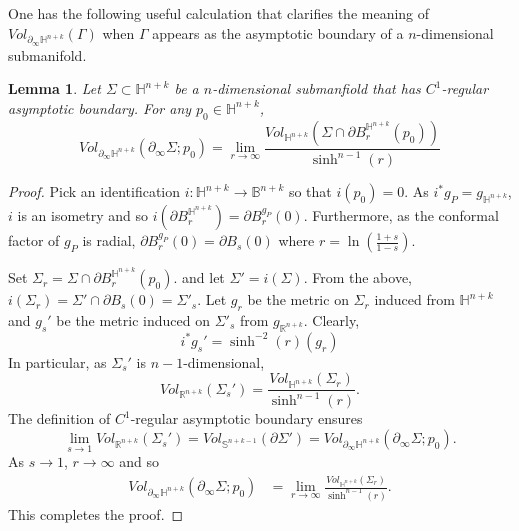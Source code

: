 \documentclass{amsart}
\newtheorem{lem}[thm]{Lemma}
\theoremstyle{definition}
\theoremstyle{remark}
\numberwithin{equation}{section}
\newcommand{\Real}{\mathbb R}
\begin{document}
One has the following useful calculation that clarifies the meaning of $Vol_{\partial _\infty \mathbb{H}^{n+k}}(\Gamma)$ when $\Gamma$ appears as the asymptotic boundary of a $n$-dimensional submanifold.
\begin{lem}\label{BoundaryLem}
Let $\Sigma \subset \mathbb{H}^{n+k}$ be a $n$-dimensional submanfiold that has $C^1$-regular asymptotic boundary. 
For any $p_0\in \mathbb{H}^{n+k}$,
$$
Vol_{\partial_\infty \mathbb{H}^{n+k}}(\partial_\infty \Sigma; p_0)=\lim_{r\to \infty} \frac{Vol_{\mathbb{H}^{n+k}}(\Sigma\cap \partial B_{r}^{\mathbb{H}^{n+k}}(p_0))}{\sinh^{n-1}(r)}
$$
\end{lem}
\begin{proof}
 Pick an identification $i:\mathbb{H}^{n+k}\to \mathbb{B}^{n+k}$ so that $i(p_0)=0$.  As $i^{*}g_P=g_{\mathbb{H}^{n+k}}$, $i$ is an isometry and so
 $i(\partial B_r^{\mathbb{H}^{n+k}})=\partial B_{r}^{g_P}(0)$.  Furthermore, as the conformal factor of $g_P$ is radial, $\partial B_{r}^{g_P}(0)=\partial B_{s}(0)$ where $r=\ln \left( \frac{1+s}{1-s}\right) $.
 
 Set $\Sigma_r=\Sigma\cap \partial B_{r}^{\mathbb{H}^{n+k}}(p_0)$. 
 and let $\Sigma'=i(\Sigma)$. From the above,   $i(\Sigma_r)=\Sigma'\cap \partial B_s(0)=\Sigma'_s$.  Let $g_r$ be the metric on $\Sigma_r$ induced from $\mathbb{H}^{n+k}$ and $g_{s}'$ be the metric induced on $\Sigma'_s$ from $g_{\Real^{n+k}}$.  Clearly,
 $$
 i^*g_{s}'= \sinh^{-2}(r)(g_r)
 $$
 In particular, as $\Sigma_s'$ is $n-1$-dimensional,
 $$
 Vol_{\Real^{n+k}}(\Sigma_s')= \frac{Vol_{\mathbb{H}^{n+k}}(\Sigma_r)}{\sinh^{n-1}(r) }.
 $$
 The definition of $C^1$-regular asymptotic boundary ensures
 $$
 \lim_{s\to 1} Vol_{\Real^{n+k}}(\Sigma_s')=Vol_{\mathbb{S}^{n+k-1}}(\partial \Sigma' )= Vol_{\partial_\infty \mathbb{H}^{n+k}}(\partial_\infty \Sigma; p_0).
 $$
As $s\to 1$,  $r\to \infty$ and so
 \begin{align*}
 Vol_{\partial_\infty \mathbb{H}^{n+k}}(\partial_\infty \Sigma; p_0) &=
 \lim_{r\to \infty}   \frac{Vol_{\mathbb{H}^{n+k}}(\Sigma_r)}{\sinh^{n-1}(r)}.
 \end{align*}
 This completes the proof.
\end{proof}
\end{document}
